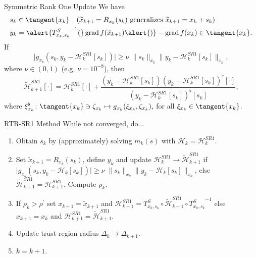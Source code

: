 \documentclass{beamer}
\begin{document}
\begin{frame}{Symmetric Rank One Update}
    We have
    \begin{align*}
        & s_k \in \tangent{x_k} \quad (\widetilde{x}_{k+1} = R_{x_k}(s_k) \text{ generalizes } \widetilde{x}_{k+1} = x_k + s_k) \\
        & y_k = \alert{{T^{S}_{x_k, s_k}}^{-1} (} \operatorname{grad}f(\widetilde{x}_{k+1}) \alert{)} - \operatorname{grad}f(x_k) \in \tangent{x_k}.
    \end{align*}
    If
    \begin{equation*}
        \lvert g_{x_k}(s_k, y_k - \mathcal{H}^{SR1}_k[s_k]) \rvert \geq \nu \; \lVert s_k \rVert_{x_k} \lVert y_k - \mathcal{H}^{SR1}_k[s_k] \rVert_{x_k},
    \end{equation*}
    where $\nu \in (0,1)$ (e.g. $\nu = 10^{-8}$), then
    \begin{equation*}
        \widetilde{\mathcal{H}}^{SR1}_{k+1} [\cdot] = \mathcal{H}^{SR1}_k [\cdot] + \frac{(y_k - \mathcal{H}^{SR1}_k [s_k]) (y_k - \mathcal{H}^{SR1}_k [s_k])^{\flat} [\cdot] }{(y_k - \mathcal{H}^{SR1}_k [s_k])^{\flat} [s_k]},
    \end{equation*}
    where $\xi^{\flat}_{x_k} \colon \tangent{x_k} \ni \zeta_{x_k} \mapsto g_{x_k}(\xi_{x_k}, \zeta_{x_k}),$ for all $\xi_{x_k} \in \tangent{x_k}$.
\end{frame}

\begin{frame}{RTR-SR1 Method}
    While not converged, do... 

    \begin{enumerate}
        \item Obtain $s_k$ by (approximately) solving $m_k(s)$ with $\mathcal{H}_k = \mathcal{H}^{SR1}_k$.
        \item Set $\widetilde{x}_{k+1} = R_{x_k}(s_k)$, define $y_k$ and update $\mathcal{H}^{SR1}_k \rightarrow \widetilde{\mathcal{H}}^{SR1}_{k+1}$ if $\lvert g_{x_k}(s_k, y_k - \mathcal{H}_k[s_k]) \rvert \geq \nu \; \lVert s_k \rVert_{x_k} \lVert y_k - \mathcal{H}_k[s_k] \rVert_{x_k}$, else $\widetilde{\mathcal{H}}^{SR1}_{k+1} = \mathcal{H}^{SR1}_{k+1}$. Compute $\rho_k$.
        \item If $\rho_k > \rho^{\prime}$ set $x_{k+1} = \widetilde{x}_{k+1}$ and $\mathcal{H}^{SR1}_{k+1} = T^{S}_{x_k, s_k} \circ \widetilde{\mathcal{H}}^{SR1}_{k+1} \circ  {T^{S}_{x_k, s_k}}^{-1}$ else $x_{k+1} = x_k$ and $\mathcal{H}^{SR1}_{k+1} = \widetilde{\mathcal{H}}^{SR1}_{k+1}$.
        \item Update trust-region radius $\Delta_k \rightarrow \Delta_{k+1}$.
        \item $k = k+1$.
    \end{enumerate}
\end{frame}
\end{document}
